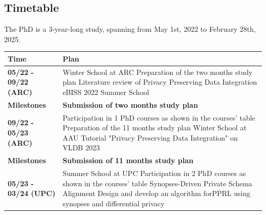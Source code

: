 \documentclass[12pt]{article}
\begin{document}
\subsection{Timetable}
The PhD is a 3-year-long study, spanning from May 1st, 2022 to February 28th, 2025.
\begin{table}[h]
   \centering
   \begin{tabular}{lp{}}
       \textbf{Time}        & \textbf{Plan}                                                               \\
       \toprule
       \textbf{05/22 - 09/22 (ARC)}   &
       Winter School at ARC \newline
       Preparation of the two months study plan                         \newline
       Literature review of Privacy Preserving Data Integration    \newline
       eBISS 2022 Summer School \\
       \textbf{Milestones}  &
       \textbf{Submission of two months study plan}                                                       \\
       \midrule
       \textbf{09/22 - 05/23 (ARC)} &
       Participation in 1 PhD courses as shown in the courses' table \newline
       Preparation of the 11 months study plan \newline
       Winter School at AAU \newline
       Tutorial "Privacy Preserving Data Integration" on VLDB 2023 \\
       \textbf{Milestones}  &
       \textbf{Submission of 11 months study plan}                                                        \\
       \midrule
       \textbf{05/23 - 03/24 (UPC)}   &
       Summer School at UPC                                                                                     Participation in 2 PhD courses as shown in the courses' table \newline
       Synopses-Driven Private Schema Alignment \newline                                                            
       Design and develop an algorithm for\newline PPRL using synopses and differential privacy \\ 

\end{tabular}
\end{table}
\end{document}
